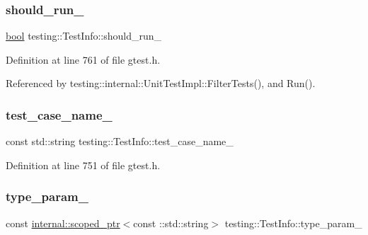 \subsubsection{\texorpdfstring{should\+\_\+run\+\_\+}{should\_run\_}}
{\footnotesize\ttfamily \hyperlink{classbool}{bool} testing\+::\+Test\+Info\+::should\+\_\+run\+\_\+\hspace{0.3cm}{\ttfamily [private]}}



Definition at line 761 of file gtest.\+h.



Referenced by testing\+::internal\+::\+Unit\+Test\+Impl\+::\+Filter\+Tests(), and Run().

\mbox{\label{classtesting_1_1TestInfo_a3dcf626bbfc3756103be329c05377a5f}} 
\subsubsection{\texorpdfstring{test\+\_\+case\+\_\+name\+\_\+}{test\_case\_name\_}}
{\footnotesize\ttfamily const std\+::string testing\+::\+Test\+Info\+::test\+\_\+case\+\_\+name\+\_\+\hspace{0.3cm}{\ttfamily [private]}}



Definition at line 751 of file gtest.\+h.

\mbox{\label{classtesting_1_1TestInfo_ab4f53cfaf59e1b5cac858a9322697e88}} 
\subsubsection{\texorpdfstring{type\+\_\+param\+\_\+}{type\_param\_}}
{\footnotesize\ttfamily const \hyperlink{classtesting_1_1internal_1_1scoped__ptr}{internal\+::scoped\+\_\+ptr}$<$const \+::std\+::string$>$ testing\+::\+Test\+Info\+::type\+\_\+param\+\_\+\hspace{0.3cm}{\ttfamily [private]}}



